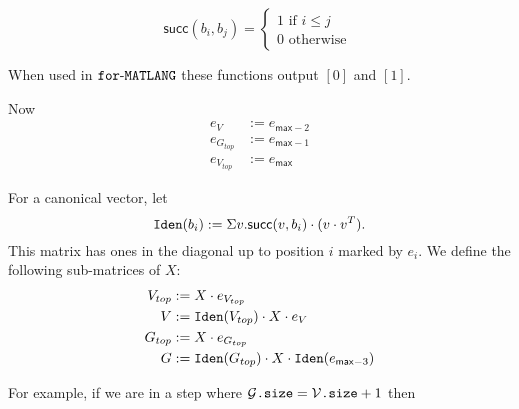 \[
  			\mathsf{succ}(b_i,b_j)=\begin{cases}
               1 \text{ if } i\leq j \\
               0 \text{ otherwise }
             \end{cases}
\]

When used in $\texttt{for}\text{-}\texttt{MATLANG}$ these functions output $[0]$ and $[1]$.

Now 
\begin{align*}
	e_{V}&:=e_{\mathsf{max}-2} \\
	e_{G_{top}}&:=e_{\mathsf{max}-1} \\
	e_{V_{top}}&:=e_{\mathsf{max}}
\end{align*}

For a canonical vector, let $$\texttt{Iden}(b_i):=\Sigma v. \mathsf{succ}(v,b_i)\cdot (v\cdot v^T).$$ This matrix has ones in the diagonal up to position $i$ marked by $e_{i}$. We define the following sub-matrices of $X$:
\begin{align*}
	V_{top} &:= X\cdot e_{V_{top}} \\
	V &:= \texttt{Iden}(V_{top}) \cdot X \cdot e_V \\
 	G_{top} &:=X\cdot e_{G_{top}} \\
 	G &:= \texttt{Iden}(G_{top})\cdot X \cdot \texttt{Iden}(e_{\mathsf{max}-3})
\end{align*}

For example, if we are in a step where $\mathcal{G}\texttt{.size}=\mathcal{V}\texttt{.size} + 1$ then

